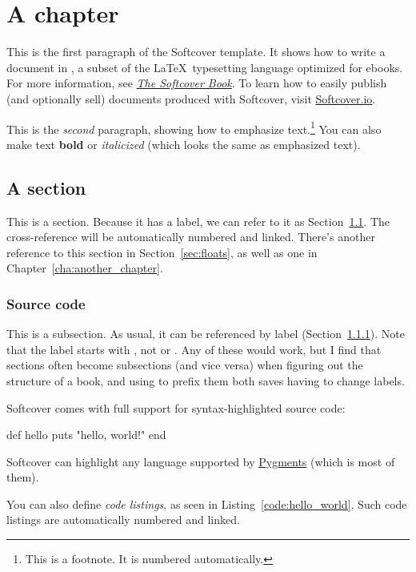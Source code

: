 \chapter{A chapter}
\label{cha:a_chapter}

This is the first paragraph of the Softcover template. It shows how to write a document in \PolyTeX, a subset of the \LaTeX\ typesetting language optimized for ebooks. For more information, see \href{http://manual.softcover.org/book}{\emph{The Softcover Book}}. To learn how to easily publish (and optionally sell) documents produced with Softcover, visit \href{http://softcover.io/}{Softcover.io}.

This is the \emph{second} paragraph, showing how to emphasize text.\footnote{This is a footnote. It is numbered automatically.} You can also make text \textbf{bold} or \textit{italicized} (which looks the same as emphasized text).

\section{A section}
\label{sec:a_section}

This is a section. Because it has a label, we can refer to it as Section~\ref{sec:a_section}. The cross-reference will be automatically numbered and linked. There's another reference to this section in Section~\ref{sec:floats}, as well as one in Chapter~\ref{cha:another_chapter}.

\subsection{Source code}
\label{sec:source_code}

This is a subsection. As usual, it can be referenced by label (Section~\ref{sec:source_code}). Note that the label starts with , not  or . Any of these would work, but I find that sections often become subsections (and vice versa) when figuring out the structure of a book, and using  to prefix them both saves having to change labels.

Softcover comes with full support for syntax-highlighted source code:
\begin{code}
def hello
  puts "hello, world!"
end
\end{code}
\noindent Softcover can highlight any language supported by \href{http://pygments.org/languages/}{Pygments} (which is most of them).

You can also define \emph{code listings}, as seen in Listing~\ref{code:hello_world}. Such code listings are automatically numbered and linked.

